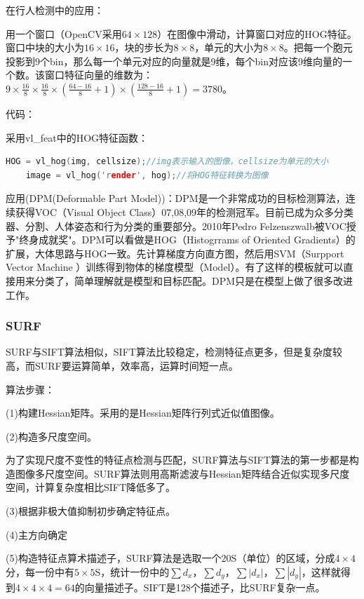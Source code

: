 \documentclass[12pt]{article}
\begin{document}
{\color{blue}在行人检测中的应用}：

用一个窗口（OpenCV采用$64 \times 128$）在图像中滑动，计算窗口对应的HOG特征。窗口中块的大小为$16 \times 16$，块的步长为$8 \times 8$，单元的大小为$8 \times 8$。把每一个胞元投影到9个bin，那么每一个单元对应的向量就是9维，每个bin对应该9维向量的一个数。该窗口特征向量的维数为：$9 \times \frac{16}{8} \times \frac{16}{8} \times (\frac{64-16}{8}+1) \times (\frac{128-16}{8}+1)=3780$。

{\color{blue}代码}：

采用vl\_feat中的HOG特征函数：
    \begin{lstlisting}[language=C++]
    HOG = vl_hog(img, cellsize);//img表示输入的图像，cellsize为单元的大小
    image = vl_hog('render', hog);//将HOG特征转换为图像
    \end{lstlisting}
    
{\color{blue}应用(DPM(Deformable Part Model))}：DPM是一个非常成功的目标检测算法，连续获得VOC（Visual Object Class）07,08,09年的检测冠军。目前已成为众多分类器、分割、人体姿态和行为分类的重要部分。2010年Pedro Felzenszwalb被VOC授予"终身成就奖"。DPM可以看做是HOG（Histogrrams of Oriented Gradients）的扩展，大体思路与HOG一致。先计算梯度方向直方图，然后用SVM（Surpport Vector Machine ）训练得到物体的梯度模型（Model）。有了这样的模板就可以直接用来分类了，简单理解就是模型和目标匹配。DPM只是在模型上做了很多改进工作。


  
\subsubsection{SURF}

SURF与SIFT算法相似，SIFT算法比较稳定，检测特征点更多，但是复杂度较高，而SURF要运算简单，效率高，运算时间短一点。

{\color{blue}算法步骤}：

(1)构建Hessian矩阵。采用的是Hessian矩阵行列式近似值图像。

(2)构造多尺度空间。

为了实现尺度不变性的特征点检测与匹配，SURF算法与SIFT算法的第一步都是构造图像多尺度空间。SURF算法则用高斯滤波与Hessian矩阵结合近似实现多尺度空间，计算复杂度相比SIFT降低多了。

(3)根据非极大值抑制初步确定特征点。

(4)主方向确定

(5)构造特征点算术描述子，SURF算法是选取一个20S（单位）的区域，分成$4 \times 4$分，每一份中有$5 \times 5$S，统计一份中的$\sum d_{x}$，$\sum d_{y}$，$\sum |d_{x}|$，$\sum |d_{y}|$，这样就得到$4 \times 4 \times 4 = 64$的向量描述子。SIFT是128个描述子，比SURF复杂一点。
\end{document}
